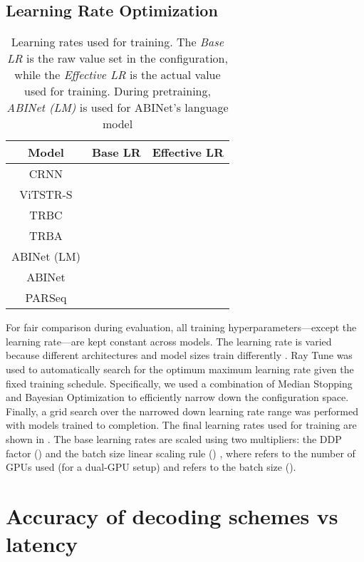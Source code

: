 \subsection{Learning Rate Optimization}
\label{ch:learning-rates}

\begin{table}[htbp]
  \centering
  \fontsize{7}{8.4}\selectfont
  \setlength{\tabcolsep}{5pt}
  \caption[Learning rates used for training.]{Learning rates used for training. The \textit{Base LR} is the raw value set in the configuration, while the \textit{Effective LR} is the actual value used for training. During pretraining, \textit{ABINet (LM)} is used for ABINet's language model}
  \begin{tabular}{ c | r r }
    \toprule
    Model & Base LR & Effective LR \\
    \midrule
    CRNN &  &  \\
    ViTSTR-S &  &  \\
    TRBC &  &  \\
    TRBA &  &  \\
    ABINet (LM) &  &  \\
    ABINet &  &  \\
    PARSeq &  &  \\
    \bottomrule
  \end{tabular}
  \label{tab:learning-rates}
\end{table}

For fair comparison during evaluation, all training hyperparameters---except the learning rate---are kept constant across models. The learning rate is varied because different architectures and model sizes train differently \cite{li2020train}. Ray Tune \cite{liaw2018tune} was used to automatically search for the optimum maximum learning rate given the fixed training schedule. Specifically, we used a combination of Median Stopping \cite{Vizier} and Bayesian Optimization \cite{balandat2020botorch} to efficiently narrow down the configuration space. Finally, a grid search over the narrowed down learning rate range was performed with models trained to completion. The final learning rates used for training are shown in . The base learning rates are scaled using two multipliers: the DDP factor () and the batch size linear scaling rule () \cite{goyal2017accurate}, where  refers to the number of GPUs used (\ie  for a dual-GPU setup) and  refers to the batch size (\ie ).

\section{Accuracy of decoding schemes vs latency}
\label{sec:acc-vs-latency}

